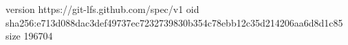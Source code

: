 version https://git-lfs.github.com/spec/v1
oid sha256:e713d088dac3def49737ec7232739830b354c78ebb12c35d214206aa6d8d1c85
size 196704
